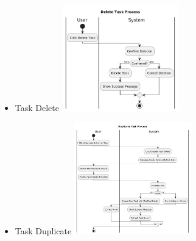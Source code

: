 \begin{itemize}
  \item Task Delete
  \newline
  \includegraphics[width=0.4\textwidth]{assets/activity_diagrams/task_delete.png}
  \item Task Duplicate
  \newline
  \includegraphics[width=0.4\textwidth]{assets/activity_diagrams/task_duplicate.png}
\end{itemize}